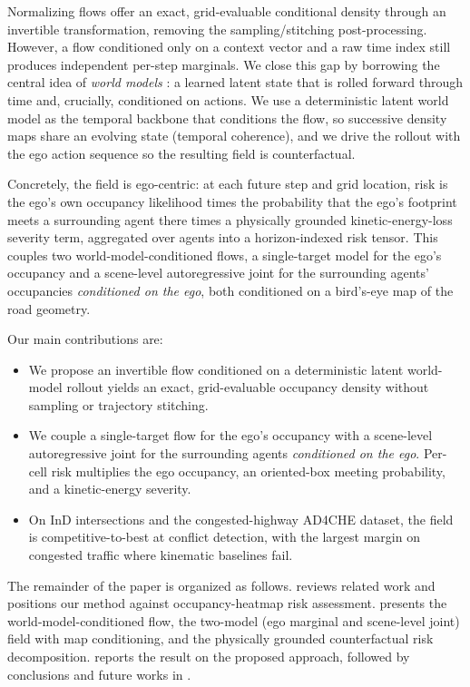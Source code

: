 \documentclass[journal]{IEEEtran}
\begin{document}
Normalizing flows offer an exact, grid-evaluable conditional density through an invertible transformation, removing the sampling/stitching post-processing. However, a flow conditioned only on a context vector and a raw time index still produces independent per-step marginals. We close this gap by borrowing the central idea of \emph{world models} : a learned latent state that is rolled forward through time and, crucially, conditioned on actions. We use a deterministic latent world model as the temporal backbone that conditions the flow, so successive density maps share an evolving state (temporal coherence), and we drive the rollout with the ego action sequence so the resulting field is counterfactual.

Concretely, the field is ego-centric: at each future step and grid location, risk is the ego's own occupancy likelihood times the probability that the ego's footprint meets a surrounding agent there times a physically grounded kinetic-energy-loss severity term, aggregated over agents into a horizon-indexed risk tensor. This couples two world-model-conditioned flows, a single-target model for the ego's occupancy and a scene-level autoregressive joint for the surrounding agents' occupancies \emph{conditioned on the ego}, both conditioned on a bird's-eye map of the road geometry.

Our main contributions are:
\begin{itemize}
\item We propose an invertible flow conditioned on a deterministic latent world-model rollout yields an exact, grid-evaluable occupancy density without sampling or trajectory stitching.
\item We couple a single-target flow for the ego's occupancy with a scene-level autoregressive joint for the surrounding agents \emph{conditioned on the ego}. Per-cell risk multiplies the ego occupancy, an oriented-box meeting probability, and a kinetic-energy severity.
\item On InD intersections and the congested-highway AD4CHE dataset, the field is competitive-to-best at conflict detection, with the largest margin on congested traffic where kinematic baselines fail.
\end{itemize}

The remainder of the paper is organized as follows.  reviews related work and positions our method against occupancy-heatmap risk assessment.  presents the world-model-conditioned flow, the two-model (ego marginal and scene-level joint) field with map conditioning, and the physically grounded counterfactual risk decomposition.  reports the result on the proposed approach, followed by conclusions and future works in .
\end{document}
